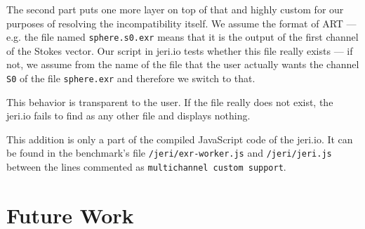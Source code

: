 The second part puts one more layer on top of that and highly custom for our purposes of resolving the incompatibility itself. We assume the format of ART --- e.g. the file named \texttt{sphere.s0.exr} means that it is the output of the first channel of the Stokes vector. Our script in jeri.io tests whether this file really exists --- if not, we assume from the name of the file that the user actually wants the channel \texttt{S0} of the file \texttt{sphere.exr} and therefore we switch to that.

This behavior is transparent to the user. If the file really does not exist, the jeri.io fails to find as any other file and displays nothing.

This addition is only a part of the compiled JavaScript code of the jeri.io. It can be found in the benchmark's file \texttt{/jeri/exr-worker.js} and \texttt{/jeri/jeri.js} between the lines commented as \texttt{multichannel custom support}.

\section{Future Work}